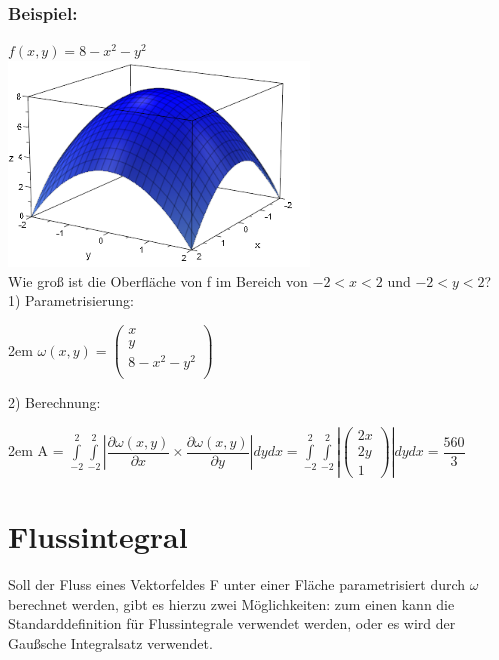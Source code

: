 \documentclass[11pt,final]{scrreprt}
\begin{document}
\subsubsection{Beispiel:}
$ f(x, y) = 8-x^2-y^2 $\\
\includegraphics[width=8cm]{images/integrale/volumen1.png}\\
Wie groß ist die Oberfläche von f im Bereich von $-2<x<2$ und $-2<y<2$?\\

1) Parametrisierung:

\begingroup
\leftskip2em 
$ \omega(x, y) = \left(\begin{matrix}
x\\ y\\ 8-x^2-y^2\\
\end{matrix}\right) $\\
\par	
\endgroup

2) Berechnung:

\begingroup
\leftskip2em 
A = $\int\limits_{-2}^{2}\int\limits_{-2}^{2}\left| \dfrac{\partial \omega(x, y)}{\partial x}\times \dfrac{\partial \omega(x, y)}{\partial y} \right|dydx = \int\limits_{-2}^{2}\int\limits_{-2}^{2}\left|\left( \begin{matrix}
2x\\2y\\1
\end{matrix} \right)\right|dydx = \dfrac{560}{3}$\\
\par	
\endgroup

\section{Flussintegral}

Soll der Fluss eines Vektorfeldes F unter einer Fläche parametrisiert durch $\omega$ berechnet werden, gibt es hierzu zwei Möglichkeiten: zum einen kann  die Standarddefinition für Flussintegrale verwendet werden, oder es wird der Gaußsche Integralsatz verwendet.\\
\end{document}
